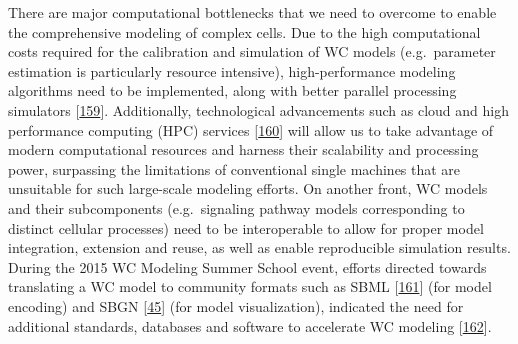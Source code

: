 \documentclass[
  12pt,
]{book}
\begin{document}
There are major computational bottlenecks that we need to overcome to enable the comprehensive modeling of complex cells.
Due to the high computational costs required for the calibration and simulation of WC models (e.g.~parameter estimation is particularly resource intensive), high-performance modeling algorithms need to be implemented, along with better parallel processing simulators {[}\protect\hyperlink{ref-Hallock2014}{159}{]}.
Additionally, technological advancements such as cloud and high performance computing (HPC) services {[}\protect\hyperlink{ref-HPC-wiki}{160}{]} will allow us to take advantage of modern computational resources and harness their scalability and processing power, surpassing the limitations of conventional single machines that are unsuitable for such large-scale modeling efforts.
On another front, WC models and their subcomponents (e.g.~signaling pathway models corresponding to distinct cellular processes) need to be interoperable to allow for proper model integration, extension and reuse, as well as enable reproducible simulation results.
During the 2015 WC Modeling Summer School event, efforts directed towards translating a WC model to community formats such as SBML {[}\protect\hyperlink{ref-Keating2020}{161}{]} (for model encoding) and SBGN {[}\protect\hyperlink{ref-Novere2009}{45}{]} (for model visualization), indicated the need for additional standards, databases and software to accelerate WC modeling {[}\protect\hyperlink{ref-Waltemath2016}{162}{]}.
\end{document}
